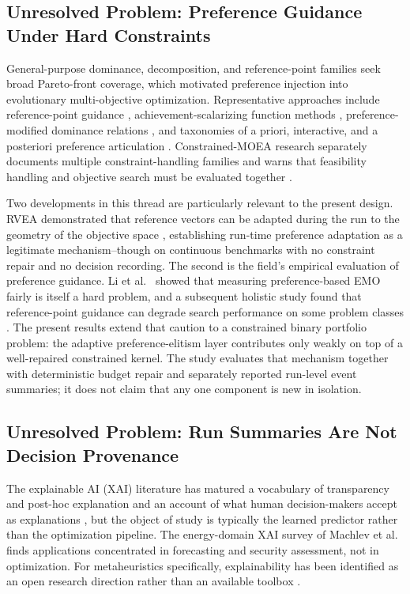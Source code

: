 \documentclass[energies,article,submit,moreauthors]{Definitions/mdpi}
\begin{document}
\subsection{Unresolved Problem: Preference Guidance Under Hard Constraints}\label{preference-guided-evolutionary-multi-objective-optimization}

General-purpose dominance, decomposition, and reference-point families \cite{ref8,ref9,ref12} seek broad Pareto-front coverage, which motivated preference injection into evolutionary multi-objective optimization. Representative approaches include reference-point guidance \cite{ref13}, achievement-scalarizing function methods \cite{ref14}, preference-modified dominance relations \cite{ref15}, and taxonomies of a priori, interactive, and a posteriori preference articulation \cite{ref16,ref17}. Constrained-MOEA research separately documents multiple constraint-handling families and warns that feasibility handling and objective search must be evaluated together \cite{ref28}.

Two developments in this thread are particularly relevant to the present design. RVEA demonstrated that reference vectors can be adapted during the run to the geometry of the objective space \cite{ref18}, establishing run-time preference adaptation as a legitimate mechanism--though on continuous benchmarks with no constraint repair and no decision recording. The second is the field's empirical evaluation of preference guidance. Li et al.~\cite{ref19} showed that measuring preference-based EMO fairly is itself a hard problem, and a subsequent holistic study found that reference-point guidance can degrade search performance on some problem classes \cite{ref20}. The present results extend that caution to a constrained binary portfolio problem: the adaptive preference-elitism layer contributes only weakly on top of a well-repaired constrained kernel. The study evaluates that mechanism together with deterministic budget repair and separately reported run-level event summaries; it does not claim that any one component is new in isolation.

\subsection{Unresolved Problem: Run Summaries Are Not Decision Provenance}\label{traceability-and-explainability-of-algorithmic-decisions}

The explainable AI (XAI) literature has matured a vocabulary of transparency and post-hoc explanation \cite{ref21} and an account of what human decision-makers accept as explanations \cite{ref22}, but the object of study is typically the learned predictor rather than the optimization pipeline. The energy-domain XAI survey of Machlev et al.~\cite{ref23} finds applications concentrated in forecasting and security assessment, not in optimization. For metaheuristics specifically, explainability has been identified as an open research direction rather than an available toolbox \cite{ref24}.
\end{document}
